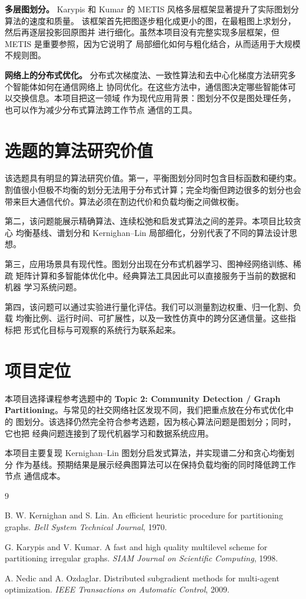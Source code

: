 \documentclass[UTF8, 11pt]{ctexart}
\begin{document}
\textbf{多层图划分。}
Karypis 和 Kumar 的 METIS 风格多层框架显著提升了实际图划分算法的速度和质量。
该框架首先把图逐步粗化成更小的图，在最粗图上求划分，然后再逐层投影回原图并
进行细化。虽然本项目没有完整实现多层框架，但 METIS 是重要参照，因为它说明了
局部细化如何与粗化结合，从而适用于大规模不规则图。

\textbf{网络上的分布式优化。}
分布式次梯度法、一致性算法和去中心化梯度方法研究多个智能体如何在通信网络上
协同优化。在这些方法中，通信图决定哪些智能体可以交换信息。本项目把这一领域
作为现代应用背景：图划分不仅是图处理任务，也可以作为减少分布式算法跨工作节点
通信的工具。

\section{选题的算法研究价值}

该选题具有明显的算法研究价值。第一，平衡图划分同时包含目标函数和硬约束。
割值很小但极不均衡的划分无法用于分布式计算；完全均衡但跨边很多的划分也会
带来巨大通信代价。算法必须在割边代价和负载均衡之间做权衡。

第二，该问题能展示精确算法、连续松弛和启发式算法之间的差异。本项目比较贪心
均衡基线、谱划分和 Kernighan--Lin 局部细化，分别代表了不同的算法设计思想。

第三，应用场景具有现代性。图划分出现在分布式机器学习、图神经网络训练、稀疏
矩阵计算和多智能体优化中。经典算法工具因此可以直接服务于当前的数据和机器
学习系统问题。

第四，该问题可以通过实验进行量化评估。我们可以测量割边权重、归一化割、负载
均衡比例、运行时间、可扩展性，以及一致性仿真中的跨分区通信量。这些指标把
形式化目标与可观察的系统行为联系起来。

\section{项目定位}

本项目选择课程参考选题中的 \textbf{Topic 2: Community Detection / Graph
Partitioning}。与常见的社交网络社区发现不同，我们把重点放在分布式优化中的
图划分。该选择仍然完全符合参考选题，因为核心算法问题是图划分；同时，它也把
经典问题连接到了现代机器学习和数据系统应用。

本项目主要复现 Kernighan--Lin 图划分启发式算法，并实现谱二分和贪心均衡划分
作为基线。预期结果是展示经典图算法可以在保持负载均衡的同时降低跨工作节点
通信成本。

\begin{thebibliography}{9}

B. W. Kernighan and S. Lin.
\newblock An efficient heuristic procedure for partitioning graphs.
\newblock \emph{Bell System Technical Journal}, 1970.

G. Karypis and V. Kumar.
\newblock A fast and high quality multilevel scheme for partitioning irregular graphs.
\newblock \emph{SIAM Journal on Scientific Computing}, 1998.

A. Nedic and A. Ozdaglar.
\newblock Distributed subgradient methods for multi-agent optimization.
\newblock \emph{IEEE Transactions on Automatic Control}, 2009.

\end{thebibliography}
\end{document}
